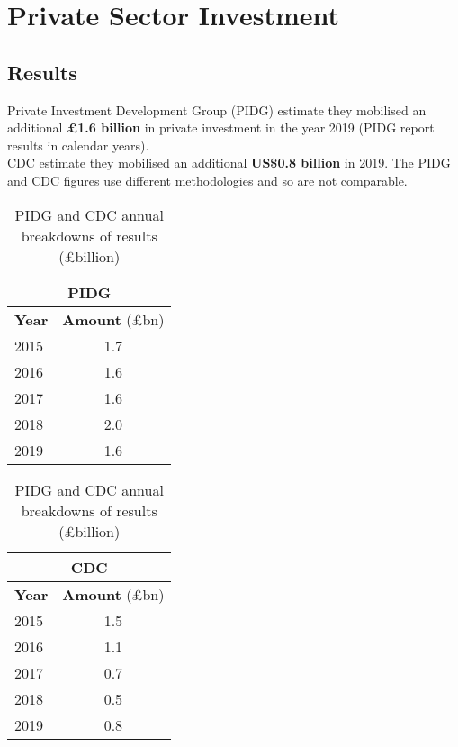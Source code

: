 \chapter{Private Sector Investment}

\section*{}


\thispagestyle{empty}


\section{Results}

Private Investment Development Group (PIDG) estimate they mobilised an additional \textbf{\pounds 1.6 billion} in private investment in the year 2019 (PIDG report results in calendar years). \\%
  
\noindent CDC estimate they mobilised an additional \textbf{US\$0.8 billion} in 2019. %
The PIDG and CDC figures use different methodologies and so are not comparable. %


\begin{table}[htbp]
  \centering
  \caption{PIDG and CDC annual breakdowns of results (\pounds billion)}\label{tab:private_pidg}
  \begin{tabular}{lc}
    \toprule
    \multicolumn{2}{c}{\textbf{PIDG}} \\ \hline
    \multicolumn{1}{c}{\textbf{Year}} & \textbf{Amount} (\pounds bn) \\ \hline
    \rule{0pt}{10pt}2015 & 1.7 \\
    2016 & 1.6 \\
    2017 & 1.6 \\
    2018 & 2.0 \\ 
    2019 & 1.6 \\ \bottomrule
  \end{tabular}
    \hspace{1em}
  \begin{tabular}{lc}
    \toprule
    \multicolumn{2}{c}{\textbf{CDC}}  \\  \hline
    \multicolumn{1}{c}{\textbf{Year}} & \textbf{Amount} (\pounds bn) \\  \hline
    \rule{0pt}{10pt}2015 & 1.5 \\
    2016 & 1.1 \\
    2017 & 0.7 \\
    2018 & 0.5 \\ 
    2019 & 0.8 \\ \bottomrule
  \end{tabular}
\end{table}



